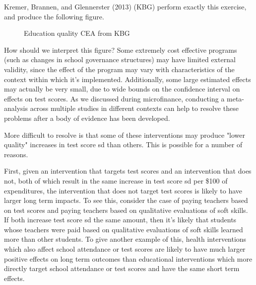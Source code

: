 \documentclass[12pt,english]{article}
\begin{document}
Kremer, Brannen, and Glennerster (2013) (KBG) perform exactly this exercise, and produce the following figure.
\begin{figure}[H]
\caption{Education quality CEA from KBG}
\centering
{}
\end{figure}
How should we interpret this figure? Some extremely cost effective programs (such as changes in school governance structures) may have limited external validity, since the effect of the program may vary with characteristics of the context within which it's implemented. Additionally, some large estimated effects may actually be very small, due to wide bounds on the confidence interval on effects on test scores. As we discussed during microfinance, conducting a meta-analysis across multiple studies in different contexts can help to resolve these problems after a body of evidence has been developed.

More difficult to resolve is that some of these interventions may produce "lower quality" increases in test score sd than others. This is possible for a number of reasons.

First, given an intervention that targets test scores and an intervention that does not, both of which result in the same increase in test score sd per \$100 of expenditures, the intervention that does not target test scores is likely to have larger long term impacts. To see this, consider the case of paying teachers based on test scores and paying teachers based on qualitative evaluations of soft skills. If both increase test score sd the same amount, then it's likely that students whose teachers were paid based on qualitative evaluations of soft skills learned more than other students. To give another example of this, health interventions which also affect school attendance or test scores are likely to have much larger positive effects on long term outcomes than educational interventions which more directly target school attendance or test scores and have the same short term effects.
\end{document}
